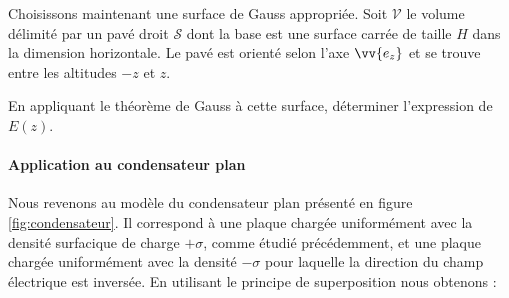 \documentclass[11pt,fleqn]{book} %
\newcommand{\dd}{\mathrm{d}}
\begin{document}
Choisissons maintenant une surface de Gauss appropriée. Soit $\mathcal{V}$ le volume délimité par un pavé droit $\mathcal{S}$ dont la base est une surface carrée de taille $H$ dans la dimension horizontale. Le pavé est orienté selon l'axe $\vv{e_z}$ et se trouve entre les altitudes $-z$ et $z$. 

\begin{capex}
En appliquant le théorème de Gauss à cette surface, déterminer l'expression de $E(z)$.
\end{capex}

%

\paragraph{Application au condensateur plan}

Nous revenons au modèle du condensateur plan présenté en figure \ref{fig:condensateur}. Il correspond à une plaque chargée uniformément avec la densité surfacique de charge $+\sigma$, comme étudié précédemment, et une plaque chargée uniformément avec la densité $-\sigma$ pour laquelle la direction  du champ électrique est inversée. En utilisant le principe de superposition nous obtenons :
\end{document}
